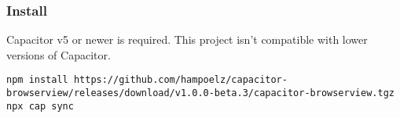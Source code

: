 \subsubsection{Install}
\label{sec:Capacitor-BrowserView:Install}

Capacitor v5 or newer is required. This project isn't compatible with lower versions of Capacitor.

\begin{verbatim}
npm install https://github.com/hampoelz/capacitor-browserview/releases/download/v1.0.0-beta.3/capacitor-browserview.tgz
npx cap sync
\end{verbatim}
